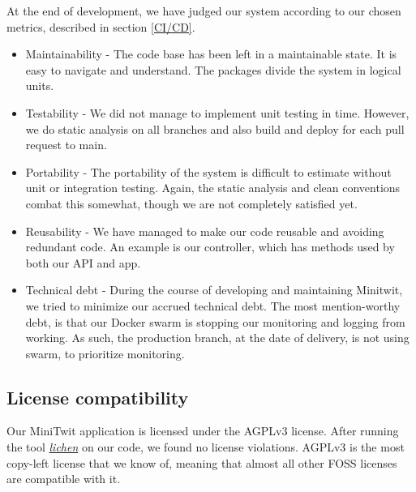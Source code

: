 At the end of development, we have judged our system according to our chosen metrics, described in section \ref{CI/CD}.
\begin{itemize}
    \item Maintainability - The code base has been left in a maintainable state. It is easy to navigate and understand. The packages divide the system in logical units.
    \item Testability  - We did not manage to implement unit testing in time. However, we do static analysis on all branches and also build and deploy for each pull request to main.
    \item Portability - The portability of the system is difficult to estimate without unit or integration testing. Again, the static analysis and clean conventions combat this somewhat, though we are not completely satisfied yet.
    \item Reusability - We have managed to make our code reusable and avoiding redundant code. An example is our controller, which has methods used by both our API and app.
    \item Technical debt - During the course of developing and maintaining Minitwit, we tried to minimize our accrued technical debt. The most mention-worthy debt, is that our Docker swarm is stopping our monitoring and logging from working. As such, the production branch, at the date of delivery, is not using swarm, to prioritize monitoring.  
\end{itemize}

\subsection{License compatibility}
Our MiniTwit application is licensed under the AGPLv3 license. After running the tool \textit{\href{https://github.com/uw-labs/lichen}{lichen}} on our code, we found no license violations. AGPLv3 is the most copy-left license that we know of, meaning that almost all other FOSS licenses are compatible with it.